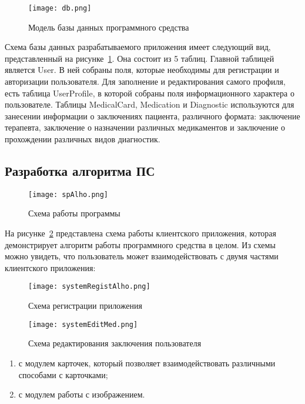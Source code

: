 \begin{figure}[ht]
\centering
  \texttt{[image: db.png]}  
  \caption{Модель базы данных программного средства}
  \label{fig:domain:manual_structure:credit_dbz}
\end{figure}

Схема базы данных разрабатываемого приложения имеет следующий вид, представленный на рисунке~\ref{fig:domain:manual_structure:credit_dbz}. Она состоит из 5 таблиц. Главной таблицей является User. В ней собраны поля, которые необходимы для регистрации и авторизации пользователя. Для заполнение и редактирования самого профиля, есть таблица UserProfile, в которой собраны поля информационного характера о пользователе. Таблицы MedicalCard, Medication и Diagnostic используются для занесении информации о заключениях пациента, различного формата: заключение терапевта, заключение о назначении различных медикаментов и заключение о прохождении различных видов диагностик.

\subsection{Разработка алгоритма ПС }
\label{sub:arch_and_mod:alholib}

\begin{figure}[ht]
\centering
  \texttt{[image: spAlho.png]}  
  \caption{Схема работы программы}
  \label{fig:domain:manual_structure:alho_sp}
\end{figure}

На рисунке~\ref{fig:domain:manual_structure:alho_sp} представлена схема работы клиентского приложения, которая демонстрирует алгоритм работы программного средства в целом. Из схемы можно увидеть, что пользователь может взаимодействовать с двумя частями клиентского приложения:

\begin{figure}[ht]
\centering
  \texttt{[image: systemRegistAlho.png]}  
  \caption{Схема регистрации приложения}
  \label{fig:domain:manual_structure:alho_regist}
\end{figure}

\begin{figure}[ht]
\centering
  \texttt{[image: systemEditMed.png]}  
  \caption{Схема редактирования заключения пользователя}
  \label{fig:domain:manual_structure:alho_edit}
\end{figure}

\begin{enumerate}
  \item с модулем карточек, который позволяет взаимодействовать различными способами с карточками;
  \item с модулем работы с изображением.
\end{enumerate}

